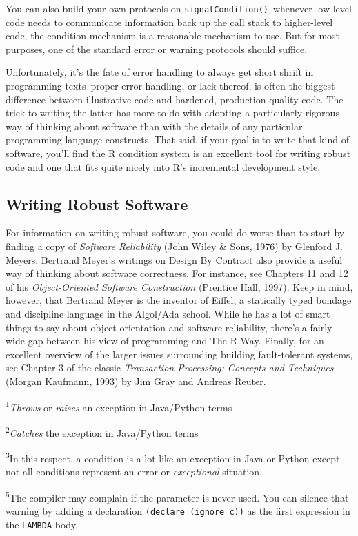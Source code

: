 You can also build your own protocols on
\texttt{signalCondition()}--whenever low-level code needs to communicate
information back up the call stack to higher-level code, the condition
mechanism is a reasonable mechanism to use. But for most purposes, one
of the standard error or warning protocols should suffice.

Unfortunately, it's the fate of error handling to always get short
shrift in programming texts--proper error handling, or lack thereof, is
often the biggest difference between illustrative code and hardened,
production-quality code. The trick to writing the latter has more to do
with adopting a particularly rigorous way of thinking about software
than with the details of any particular programming language constructs.
That said, if your goal is to write that kind of software, you'll find
the R condition system is an excellent tool for writing robust code and
one that fits quite nicely into R's incremental development style.

\hypertarget{writing-robust-software}{%
\subsection{Writing Robust Software}\label{writing-robust-software}}

For information on writing robust software, you could do worse than to
start by finding a copy of \emph{Software Reliability} (John Wiley \&
Sons, 1976) by Glenford J. Meyers. Bertrand Meyer's writings on Design
By Contract also provide a useful way of thinking about software
correctness. For instance, see Chapters 11 and 12 of his
\emph{Object-Oriented Software Construction} (Prentice Hall, 1997). Keep
in mind, however, that Bertrand Meyer is the inventor of Eiffel, a
statically typed bondage and discipline language in the Algol/Ada
school. While he has a lot of smart things to say about object
orientation and software reliability, there's a fairly wide gap between
his view of programming and The R Way. Finally, for an excellent
overview of the larger issues surrounding building fault-tolerant
systems, see Chapter 3 of the classic \emph{Transaction Processing:
Concepts and Techniques} (Morgan Kaufmann, 1993) by Jim Gray and Andreas
Reuter.

\textsuperscript{1}\emph{Throws} or \emph{raises} an exception in
Java/Python terms

\textsuperscript{2}\emph{Catches} the exception in Java/Python terms

\textsuperscript{3}In this respect, a condition is a lot like an
exception in Java or Python except not all conditions represent an error
or \emph{exceptional} situation.

\textsuperscript{5}The compiler may complain if the parameter is never
used. You can silence that warning by adding a declaration
\texttt{(declare\ (ignore\ c))} as the first expression in the
\texttt{LAMBDA} body.
